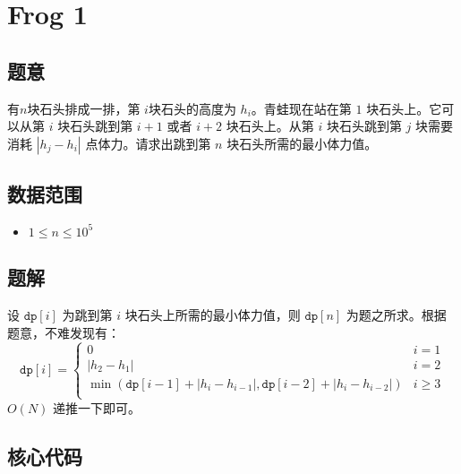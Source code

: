 \section{Frog 1}
\subsection*{题意}
有$n$块石头排成一排，第 $i$块石头的高度为 $h_i$。青蛙现在站在第 $1$ 块石头上。它可以从第 $i$ 块石头跳到第 $i+1$ 或者 $i+2$ 块石头上。从第 $i$ 块石头跳到第 $j$ 块需要消耗 $|h_j - h_i|$ 点体力。请求出跳到第 $n$ 块石头所需的最小体力值。

\subsection*{数据范围}
\begin{itemize}
\item $1\le n\le 10^5$
\end{itemize}


\subsection*{题解}

设 $\texttt{dp}[i]$ 为跳到第 $i$ 块石头上所需的最小体力值，则 $\texttt{dp}[n]$ 为题之所求。根据题意，不难发现有：
\begin{equation*}
{\texttt{dp}}[i] = 
\begin{cases}
 0 & i = 1\\
 |h_2 - h_{1}| & i = 2\\
\min(\texttt{dp}[i-1] + |h_i - h_{i-1}|,\texttt{dp}[i-2] + |h_i - h_{i-2}|) & i \ge 3 \\
\end{cases}
\end{equation*}
$O(N)$ 递推一下即可。
\subsection*{核心代码}
\inputminted[linenos,autogobble]{cpp}{./Code/A.cpp}
\newpage
